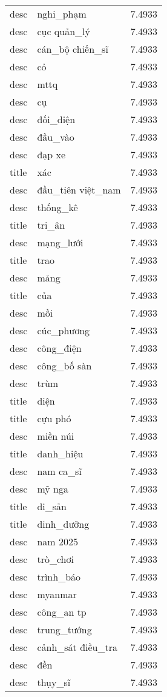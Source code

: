 \documentclass{article}
\begin{document}
\begin{tabular}{lll}
desc & nghi\_phạm & 7.4933\\
desc & cục quản\_lý & 7.4933\\
desc & cán\_bộ chiến\_sĩ & 7.4933\\
desc & cỏ & 7.4933\\
desc & mttq & 7.4933\\
desc & cụ & 7.4933\\
desc & đối\_diện & 7.4933\\
desc & đầu\_vào & 7.4933\\
desc & đạp xe & 7.4933\\
title & xác & 7.4933\\
desc & đầu\_tiên việt\_nam & 7.4933\\
desc & thống\_kê & 7.4933\\
title & tri\_ân & 7.4933\\
desc & mạng\_lưới & 7.4933\\
title & trao & 7.4933\\
desc & mảng & 7.4933\\
title & của & 7.4933\\
desc & mồi & 7.4933\\
desc & cúc\_phương & 7.4933\\
desc & công\_điện & 7.4933\\
desc & công\_bố sàn & 7.4933\\
desc & trùm & 7.4933\\
title & diện & 7.4933\\
title & cựu phó & 7.4933\\
desc & miền núi & 7.4933\\
title & danh\_hiệu & 7.4933\\
desc & nam ca\_sĩ & 7.4933\\
desc & mỹ nga & 7.4933\\
title & di\_sản & 7.4933\\
title & dinh\_dưỡng & 7.4933\\
desc & nam 2025 & 7.4933\\
desc & trò\_chơi & 7.4933\\
desc & trình\_báo & 7.4933\\
desc & myanmar & 7.4933\\
desc & công\_an tp & 7.4933\\
desc & trung\_tướng & 7.4933\\
desc & cảnh\_sát điều\_tra & 7.4933\\
desc & đền & 7.4933\\
desc & thụy\_sĩ & 7.4933\\

\end{tabular}
\end{document}
